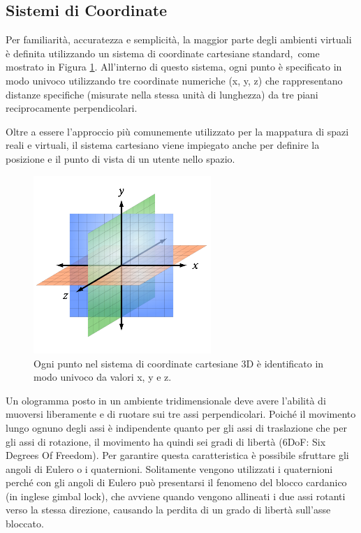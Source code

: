 \subsection{Sistemi di Coordinate}
Per familiarità, accuratezza e semplicità, la maggior parte degli ambienti virtuali è definita utilizzando un sistema di coordinate cartesiane standard, come mostrato in Figura \ref{fig:figure15}. All'interno di questo sistema, ogni punto è specificato in modo univoco utilizzando tre coordinate numeriche (x, y, z) che rappresentano distanze specifiche (misurate nella stessa unità di lunghezza) da tre piani reciprocamente perpendicolari. 

Oltre a essere l'approccio più comunemente utilizzato per la mappatura di spazi reali e virtuali, il sistema cartesiano viene impiegato anche per definire la posizione e il punto di vista di un utente nello spazio.

\begin{figure}[H]
    \centering
    \includegraphics[width=0.6\textwidth]{images/sistema-cartesiano.png}
    \caption{Ogni punto nel sistema di coordinate cartesiane 3D è identificato in modo univoco da valori x, y e z.}
    \label{fig:figure15}
\end{figure}

Un ologramma posto in un ambiente tridimensionale deve avere l'abilità di muoversi liberamente e di ruotare sui tre assi perpendicolari.
Poiché il movimento lungo ognuno degli assi è indipendente quanto per gli assi di traslazione che per gli assi di rotazione, il movimento ha quindi sei gradi di libertà (6DoF: Six Degrees Of Freedom).
Per garantire questa caratteristica è possibile sfruttare gli angoli di Eulero o i quaternioni.
Solitamente vengono utilizzati i quaternioni perché con gli angoli di Eulero può presentarsi il fenomeno del blocco cardanico (in inglese gimbal lock), che avviene quando vengono allineati i due assi rotanti verso la stessa direzione, causando la perdita di un grado di libertà sull'asse bloccato.

